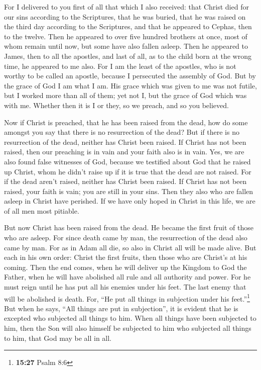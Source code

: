  For I delivered to you first of all that which I also
received: that Christ died for our sins according to the Scriptures,
 that he was buried, that he was raised on the third day
according to the Scriptures,  and that he appeared to
Cephas, then to the twelve.  Then he appeared to over five
hundred brothers at once, most of whom remain until now, but some have
also fallen asleep.  Then he appeared to James, then to
all the apostles,  and last of all, as to the child born
at the wrong time, he appeared to me also.  For I am the
least of the apostles, who is not worthy to be called an apostle,
because I persecuted the assembly of God.  But by the
grace of God I am what I am. His grace which was given to me was not
futile, but I worked more than all of them; yet not I, but the grace of
God which was with me.  Whether then it is I or they, so
we preach, and so you believed.

 Now if Christ is preached, that he has been raised from
the dead, how do some amongst you say that there is no resurrection of
the dead?  But if there is no resurrection of the dead,
neither has Christ been raised.  If Christ has not been
raised, then our preaching is in vain and your faith also is in vain.
 Yes, we are also found false witnesses of God, because
we testified about God that he raised up Christ, whom he didn't raise up
if it is true that the dead are not raised.  For if the
dead aren't raised, neither has Christ been raised.  If
Christ has not been raised, your faith is vain; you are still in your
sins.  Then they also who are fallen asleep in Christ
have perished.  If we have only hoped in Christ in this
life, we are of all men most pitiable.

 But now Christ has been raised from the dead. He became
the first fruit of those who are asleep.  For since death
came by man, the resurrection of the dead also came by man.
 For as in Adam all die, so also in Christ all will be
made alive.  But each in his own order: Christ the first
fruits, then those who are Christ's at his coming.  Then
the end comes, when he will deliver up the Kingdom to God the Father,
when he will have abolished all rule and all authority and power.
 For he must reign until he has put all his enemies under
his feet.  The last enemy that will be abolished is
death.  For, ``He put all things in subjection under his
feet.''\footnote{\textbf{15:27} Psalm 8:6} But when he says, ``All
things are put in subjection'', it is evident that he is excepted who
subjected all things to him.  When all things have been
subjected to him, then the Son will also himself be subjected to him who
subjected all things to him, that God may be all in all.

